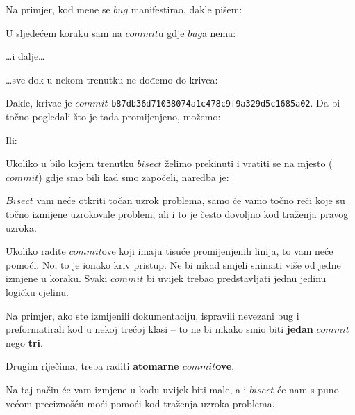 Na primjer, kod mene se $bug$ manifestirao, dakle pišem:



U sljedećem koraku sam na $commit$u gdje $bug$a nema:



\dots{}i dalje\dots



\dots{}sve dok u nekom trenutku ne dođemo do krivca:



Dakle, krivac je $commit$ \verb+b87db36d71038074a1c478c9f9a329d5c1685a02+.
Da bi točno pogledali što je tada promijenjeno, možemo:


Ili:


Ukoliko u bilo kojem trenutku $bisect$ želimo prekinuti i vratiti se na mjesto ($commit$) gdje smo bili kad smo započeli, naredba je:



$Bisect$ vam neće otkriti točan uzrok problema, samo će vamo točno reći koje su točno izmijene uzrokovale problem, ali i to je često dovoljno kod traženja pravog uzroka. 

Ukoliko radite $commit$ove koji imaju tisuće promijenjenih linija, to vam neće pomoći.
No, to je ionako kriv pristup.
Ne bi nikad smjeli snimati više od jedne izmjene u koraku.
Svaki $commit$ bi uvijek trebao predstavljati jednu jedinu logičku cjelinu.

Na primjer, ako ste izmijenili dokumentaciju, ispravili nevezani bug i preformatirali kod u nekoj trećoj klasi -- to ne bi nikako smio biti \textbf{jedan} $commit$ nego \textbf{tri}.

Drugim riječima, treba raditi \textbf{atomarne $commit$ove}.

Na taj način će vam izmjene u kodu uvijek biti male, a i $bisect$ će nam s puno većom preciznošću moći pomoći kod traženja uzroka problema.
